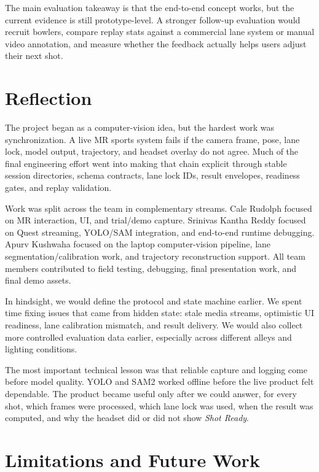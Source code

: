 \documentclass[11pt]{article}
\begin{document}
The main evaluation takeaway is that the end-to-end concept works, but the current evidence is still prototype-level. A stronger follow-up evaluation would recruit bowlers, compare replay stats against a commercial lane system or manual video annotation, and measure whether the feedback actually helps users adjust their next shot.

\section{Reflection}

The project began as a computer-vision idea, but the hardest work was synchronization. A live MR sports system fails if the camera frame, pose, lane lock, model output, trajectory, and headset overlay do not agree. Much of the final engineering effort went into making that chain explicit through stable session directories, schema contracts, lane lock IDs, result envelopes, readiness gates, and replay validation.

Work was split across the team in complementary streams. Cale Rudolph focused on MR interaction, UI, and trial/demo capture. Srinivas Kantha Reddy focused on Quest streaming, YOLO/SAM integration, and end-to-end runtime debugging. Apurv Kushwaha focused on the laptop computer-vision pipeline, lane segmentation/calibration work, and trajectory reconstruction support. All team members contributed to field testing, debugging, final presentation work, and final demo assets.

In hindsight, we would define the protocol and state machine earlier. We spent time fixing issues that came from hidden state: stale media streams, optimistic UI readiness, lane calibration mismatch, and result delivery. We would also collect more controlled evaluation data earlier, especially across different alleys and lighting conditions.

The most important technical lesson was that reliable capture and logging come before model quality. YOLO and SAM2 worked offline before the live product felt dependable. The product became useful only after we could answer, for every shot, which frames were processed, which lane lock was used, when the result was computed, and why the headset did or did not show \emph{Shot Ready}.

\section{Limitations and Future Work}
\end{document}
